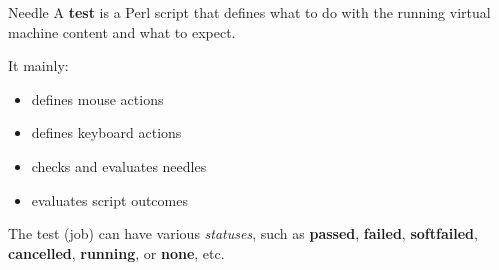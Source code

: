 \documentclass[12pt,aspectratio=169]{beamer}
\begin{document}
\begin{frame}{Needle}
	A \textbf{test} is a Perl script that defines what to do with the running virtual machine content and what to expect. 
	
	It mainly:
	
	\vspace{5pt}
	
	\begin{itemize}
		\item defines mouse actions
		\item defines keyboard actions
		\item checks and evaluates needles
		\item evaluates script outcomes
	\end{itemize}
	
	\vspace{5pt}
	
	The test (job) can have various \textit{statuses}, such as \textbf{passed}, \textbf{failed}, \textbf{softfailed}, \textbf{cancelled}, \textbf{running}, or \textbf{none}, etc.
\end{frame}
\end{document}
